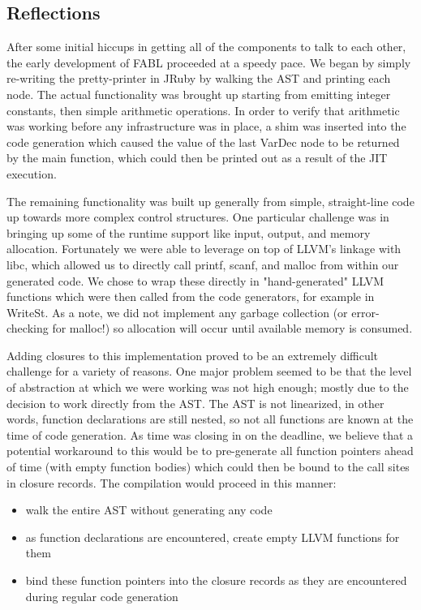 \documentclass[11pt]{article} %
\begin{document}
\subsection{Reflections}

After some initial hiccups in getting all of the components to talk to each other, the early development of FABL proceeded at a speedy pace. We began by simply re-writing the pretty-printer in JRuby by walking the AST and printing each node. The actual functionality was brought up starting from emitting integer constants, then simple arithmetic operations. In order to verify that arithmetic was working before any infrastructure was in place, a shim was inserted into the code generation which caused the value of the last VarDec node to be returned by the main function, which could then be printed out as a result of the JIT execution. 

The remaining functionality was built up generally from simple, straight-line code up towards more complex control structures. One particular challenge was in bringing up some of the runtime support like input, output, and memory allocation. Fortunately we were able to leverage on top of LLVM's linkage with libc, which allowed us to directly call printf, scanf, and malloc from within our generated code. We chose to wrap these directly in "hand-generated" LLVM functions which were then called from the code generators, for example in WriteSt. As a note, we did not implement any garbage collection (or error-checking for malloc!) so allocation will occur until available memory is consumed.

Adding closures to this implementation proved to be an extremely difficult challenge for a variety of reasons. One major problem seemed to be that the level of abstraction at which we were working was not high enough; mostly due to the decision to work directly from the AST. The AST is not linearized, in other words, function declarations are still nested, so not all functions are known at the time of code generation. As time was closing in on the deadline, we believe that a potential workaround to this would be to pre-generate all function pointers ahead of time (with empty function bodies) which could then be bound to the call sites in closure records. The compilation would proceed in this manner:

\begin{itemize}
\item{walk the entire AST without generating any code}
\item{as function declarations are encountered, create empty LLVM functions for them}
\item{bind these function pointers into the closure records as they are encountered during regular code generation}
\end{itemize}
\end{document}
